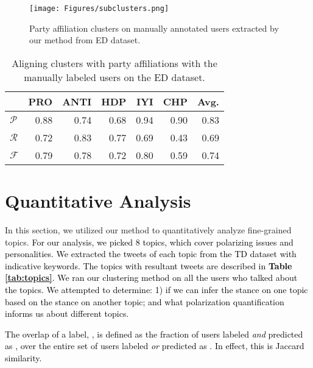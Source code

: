 \documentclass[letterpaper]{article} \usepackage{aaai20}  \usepackage{times}  \usepackage{stackengine}
\renewcommand{\prec}{\ensuremath{\mathcal{P}}\xspace}
\newcommand{\recall}{\ensuremath{\mathcal{R}}\xspace}
\newcommand{\fscore}{\ensuremath{\mathcal{F}}\xspace}
\newcommand{\changes}{\textcolor{black}}
\begin{document}
\begin{figure}[ht]
    \centering
    \texttt{[image: Figures/subclusters.png]}
    \caption{Party affiliation clusters on manually annotated users extracted by our method from ED dataset.}
    \label{fig:subclusters}
\end{figure}
\begin{table}[t]
    \centering
    \begin{tabular}{lrrrrrr}
\toprule
{} &   PRO &  ANTI &   HDP &   IYI &   CHP & Avg.  \\
\midrule
\prec &  0.88 &  0.74 &  0.68 &  0.94 &  0.90 & 0.83 \\\hline
\recall    &  0.72 &  0.83 &  0.77 &  0.69 &  0.43 & 0.69 \\\hline
\fscore  &  0.79 &  0.78 &  0.72 &  0.80 &  0.59 & 0.74 \\\hline
\bottomrule
\end{tabular}

    \caption{Aligning clusters with party affiliations with the manually labeled users on the ED dataset.}
    \label{tab:ed_party}
\end{table}



\section{Quantitative Analysis}
In this section, we utilized our method to quantitatively analyze fine-grained topics. \changes{For our analysis, we picked 8 topics, which cover polarizing issues and personalities. We extracted the tweets of each topic from the TD dataset with indicative keywords. The topics with resultant tweets are described in \textbf{Table \ref{tab:topics}}. We ran our clustering method on all the users who talked about the topics.  We attempted to determine: 1) if we can infer the stance on one topic based on the stance on another topic; and what polarization quantification informs us about different topics.  } 

\changes{The overlap of a label, , is defined as the fraction of users labeled \textit{and} predicted as , over the entire set of users labeled \textit{or} predicted as . In effect, this is Jaccard similarity.} 
\end{document}
